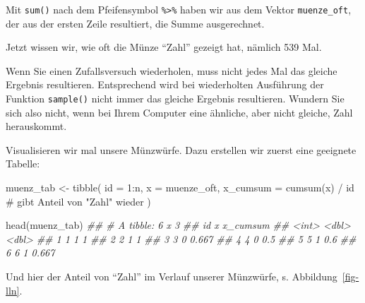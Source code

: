 \documentclass[
  a4paper,
  DIV=11]{scrreprt}
\newenvironment{Shaded}{\begin{snugshade}}{\end{snugshade}}
\newcommand{\AttributeTok}[1]{\textcolor[rgb]{0.40,0.45,0.13}{#1}}
\newcommand{\CommentTok}[1]{\textcolor[rgb]{0.37,0.37,0.37}{#1}}
\newcommand{\DecValTok}[1]{\textcolor[rgb]{0.68,0.00,0.00}{#1}}
\newcommand{\DocumentationTok}[1]{\textcolor[rgb]{0.37,0.37,0.37}{\textit{#1}}}
\newcommand{\FunctionTok}[1]{\textcolor[rgb]{0.28,0.35,0.67}{#1}}
\newcommand{\NormalTok}[1]{\textcolor[rgb]{0.00,0.23,0.31}{#1}}
\newcommand{\OtherTok}[1]{\textcolor[rgb]{0.00,0.23,0.31}{#1}}
\newcommand{\SpecialCharTok}[1]{\textcolor[rgb]{0.37,0.37,0.37}{#1}}
\theoremstyle{definition}
\theoremstyle{remark}
\begin{document}
Mit \texttt{sum()} nach dem Pfeifensymbol \texttt{\%\textgreater{}\%}
haben wir aus dem Vektor \texttt{muenze\_oft}, der aus der ersten Zeile
resultiert, die Summe ausgerechnet.

Jetzt wissen wir, wie oft die Münze ``Zahl'' gezeigt hat, nämlich 539
Mal.

\begin{tcolorbox}[enhanced jigsaw, leftrule=.75mm, toptitle=1mm, bottomtitle=1mm, titlerule=0mm, breakable, colframe=quarto-callout-note-color-frame, title=\textcolor{quarto-callout-note-color}{\faInfo}\hspace{0.5em}{Hinweis}, rightrule=.15mm, colback=white, arc=.35mm, left=2mm, bottomrule=.15mm, coltitle=black, opacitybacktitle=0.6, toprule=.15mm, colbacktitle=quarto-callout-note-color!10!white, opacityback=0]
Wenn Sie einen Zufallsversuch wiederholen, muss nicht jedes Mal das
gleiche Ergebnis resultieren. Entsprechend wird bei wiederholten
Ausführung der Funktion \texttt{sample()} nicht immer das gleiche
Ergebnis resultieren. Wundern Sie sich also nicht, wenn bei Ihrem
Computer eine ähnliche, aber nicht gleiche, Zahl herauskommt.
\end{tcolorbox}

Visualisieren wir mal unsere Münzwürfe. Dazu erstellen wir zuerst eine
geeignete Tabelle:

\begin{Shaded}
\begin{Highlighting}[]
\NormalTok{muenz\_tab }\OtherTok{\textless{}{-}}
  \FunctionTok{tibble}\NormalTok{(}
    \AttributeTok{id =} \DecValTok{1}\SpecialCharTok{:}\NormalTok{n,}
    \AttributeTok{x =}\NormalTok{ muenze\_oft,}
    \AttributeTok{x\_cumsum =} \FunctionTok{cumsum}\NormalTok{(x) }\SpecialCharTok{/}\NormalTok{ id  }\CommentTok{\# gibt Anteil von "Zahl" wieder}
\NormalTok{  )}

\FunctionTok{head}\NormalTok{(muenz\_tab)}
\DocumentationTok{\#\# \# A tibble: 6 x 3}
\DocumentationTok{\#\#      id     x x\_cumsum}
\DocumentationTok{\#\#   \textless{}int\textgreater{} \textless{}dbl\textgreater{}    \textless{}dbl\textgreater{}}
\DocumentationTok{\#\# 1     1     1    1    }
\DocumentationTok{\#\# 2     2     1    1    }
\DocumentationTok{\#\# 3     3     0    0.667}
\DocumentationTok{\#\# 4     4     0    0.5  }
\DocumentationTok{\#\# 5     5     1    0.6  }
\DocumentationTok{\#\# 6     6     1    0.667}
\end{Highlighting}
\end{Shaded}

Und hier der Anteil von ``Zahl'' im Verlauf unserer Münzwürfe, s.
Abbildung~\ref{fig-lln}.
\end{document}
